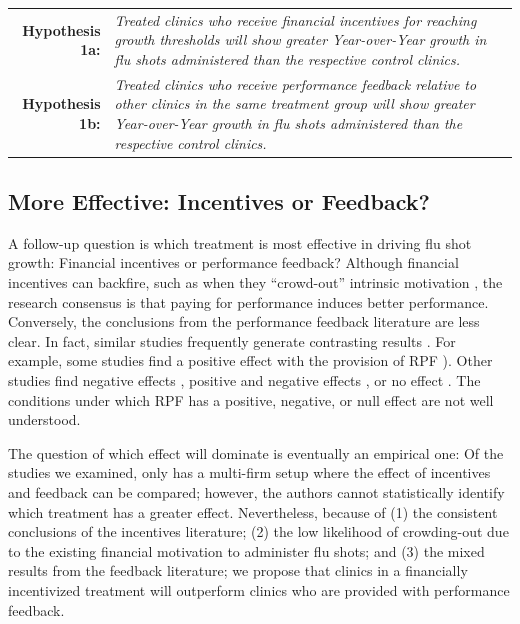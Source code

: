 \begin{onehalfspace}
 \medskip \noindent
 \begin{tabularx} {\linewidth}{ r X }
    \textbf{Hypothesis 1a:} & \textit{Treated clinics who receive financial incentives for reaching growth thresholds will show greater Year-over-Year growth in flu shots administered than the respective control clinics.} \\
    \textbf{Hypothesis 1b:} & \textit{Treated clinics who receive performance feedback relative to other clinics in the same treatment group will show greater Year-over-Year growth in flu shots administered than the respective control clinics.}
 \end{tabularx}   %
 
 \subsection{More Effective: Incentives or Feedback?}
 A follow-up question is which treatment is most effective in driving flu shot growth: Financial incentives or performance feedback? Although financial incentives can backfire, such as when they “crowd-out” intrinsic motivation \citep[e.g.,][]{Deci1971,Fehr2000,Gneezy2011,Staats2017,Lazear2018}, the research consensus is that paying for performance induces better performance. Conversely, the conclusions from the performance feedback literature are less clear. In fact, similar studies frequently generate contrasting results \citep[as discussed in][]{Dechenaux2015}. For example, some studies find a positive effect with the provision of RPF \citep[e.g.,][]{Casas-Arce2009,Azmat2010,Blanes-i-Vidal2011,Delfgaauw2013,Song2018a}). Other studies find negative effects \citep[e.g.,][]{Barankay2012,Bandiera2013,Ashraf2014}, positive and negative effects \citep[e.g.,][]{Blader2016}, or no effect \citep[e.g.,][]{Delfgaauw2014}. The conditions under which RPF has a positive, negative, or null effect are not well understood.
 
 The question of which effect will dominate is eventually an empirical one: Of the studies we examined, only \cite{Delfgaauw2013} has a multi-firm setup where the effect of incentives and feedback can be compared; however, the authors cannot statistically identify which treatment has a greater effect. Nevertheless, because of (1) the consistent conclusions of the incentives literature; (2) the low likelihood of crowding-out due to the existing financial motivation to administer flu shots; and (3) the mixed results from the feedback literature; we propose that clinics in a financially incentivized treatment will outperform clinics who are provided with performance feedback.
 

\end{onehalfspace}
